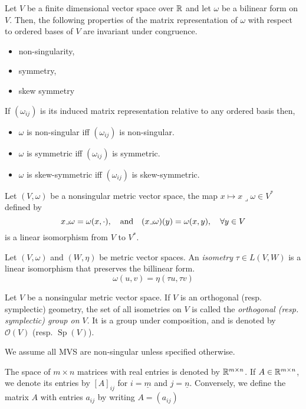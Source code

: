 \documentclass[../main-v2-manifolds.tex]{subfiles}
\begin{document}
    \begin{lemma}\label{lem:characterisation of bilinear forms}
        Let $V$ be a finite dimensional vector space over $\mathbb{R}$ and let $\omega$ be a bilinear form on $V$. Then, the following properties of the matrix representation of $\omega$ with respect to ordered bases of $V$ are invariant under congruence.
        \begin{itemize}
            \item non-singularity,
            \item symmetry,
            \item skew symmetry
        \end{itemize}
        If $(\omega_{ij})$ is its induced matrix representation relative to any ordered basis then,
        \begin{itemize}
            \item $\omega$ is non-singular iff $(\omega_{ij})$ is non-singular.
           \item $\omega$ is symmetric iff $(\omega_{ij})$ is symmetric.
           \item $\omega$ is skew-symmetric iff $(\omega_{ij})$ is skew-symmetric.
        \end{itemize}
   \end{lemma}     
    
    \begin{wts}\label{eq:Riesz Representation MVS}
        Let $(V,\omega)$ be a nonsingular metric vector space, the map $x\mapsto x\lrcorner \omega\in V^*$ defined by
        \[
            x\lrcorner\omega = \omega(x,\cdot),\qqtext{and}(x\lrcorner\omega)(y) = \omega(x,y),\quad\forall y\in V
        \]
        is a linear isomorphism from $V$ to $V^*$. 
    \end{wts}

    Let $(V,\omega)$ and $(W, \eta)$ be metric vector spaces. An \emph{isometry} $\tau\in L(V,W)$ is a linear isomorphism that preserves the billinear form.
    \[
        \omega(u,v) = \eta(\tau u, \tau v)
    \]
    \begin{definition}
        Let $V$ be a nonsingular metric vector space. If $V$ is an orthogonal (resp. symplectic) geometry, the set of all isometries on $V$ is called the \emph{orthogonal (resp. symplectic) group on $V$}. It is a group under composition, and is denoted by $\mathcal{O}(V)$ (resp. $\operatorname{Sp}(V)$).
    \end{definition}
    \begin{remark}
        We assume all MVS are non-singular unless specified otherwise.
    \end{remark}
The space of $m\times n$ matrices with real entries is denoted by $\mathbb{R}^{m\times n}$. If $A\in\mathbb{R}^{m\times n}$, we denote its entries by $[A]_{ij}$ for $i=\underline{m}$ and $j = \underline{n}$. Conversely, we define the matrix $A$ with entries $a_{ij}$ by writing $A = (a_{ij})$\\
\end{document}
